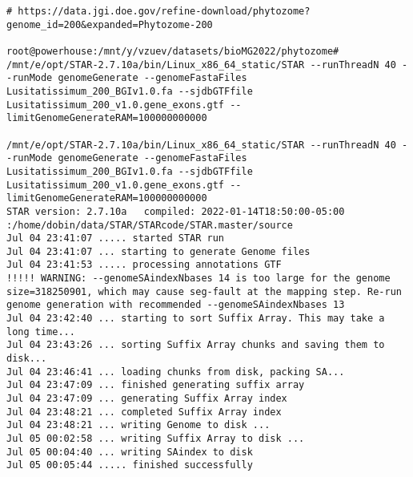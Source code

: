\begin{verbatim}
# https://data.jgi.doe.gov/refine-download/phytozome?genome_id=200&expanded=Phytozome-200

root@powerhouse:/mnt/y/vzuev/datasets/bioMG2022/phytozome# /mnt/e/opt/STAR-2.7.10a/bin/Linux_x86_64_static/STAR --runThreadN 40 --runMode genomeGenerate --genomeFastaFiles Lusitatissimum_200_BGIv1.0.fa --sjdbGTFfile Lusitatissimum_200_v1.0.gene_exons.gtf --limitGenomeGenerateRAM=100000000000

/mnt/e/opt/STAR-2.7.10a/bin/Linux_x86_64_static/STAR --runThreadN 40 --runMode genomeGenerate --genomeFastaFiles Lusitatissimum_200_BGIv1.0.fa --sjdbGTFfile Lusitatissimum_200_v1.0.gene_exons.gtf --limitGenomeGenerateRAM=100000000000
STAR version: 2.7.10a   compiled: 2022-01-14T18:50:00-05:00 :/home/dobin/data/STAR/STARcode/STAR.master/source
Jul 04 23:41:07 ..... started STAR run
Jul 04 23:41:07 ... starting to generate Genome files
Jul 04 23:41:53 ..... processing annotations GTF
!!!!! WARNING: --genomeSAindexNbases 14 is too large for the genome size=318250901, which may cause seg-fault at the mapping step. Re-run genome generation with recommended --genomeSAindexNbases 13
Jul 04 23:42:40 ... starting to sort Suffix Array. This may take a long time...
Jul 04 23:43:26 ... sorting Suffix Array chunks and saving them to disk...
Jul 04 23:46:41 ... loading chunks from disk, packing SA...
Jul 04 23:47:09 ... finished generating suffix array
Jul 04 23:47:09 ... generating Suffix Array index
Jul 04 23:48:21 ... completed Suffix Array index
Jul 04 23:48:21 ... writing Genome to disk ...
Jul 05 00:02:58 ... writing Suffix Array to disk ...
Jul 05 00:04:40 ... writing SAindex to disk
Jul 05 00:05:44 ..... finished successfully


\end{verbatim}
